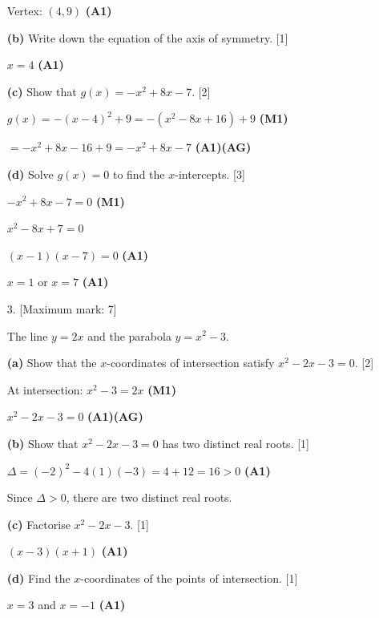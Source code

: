 \documentclass[12pt, twoside]{article}
\begin{document}
\begin{enumerate}[itemsep=0.3cm]
Vertex: $(4, 9)$ \hfill \textbf{(A1)}

\medskip

\textbf{(b)} Write down the equation of the axis of symmetry. \hfill [1]

$x = 4$ \hfill \textbf{(A1)}

\medskip

\textbf{(c)} Show that $g(x) = -x^2 + 8x - 7$. \hfill [2]

$g(x) = -(x - 4)^2 + 9 = -(x^2 - 8x + 16) + 9$ \hfill \textbf{(M1)}

$= -x^2 + 8x - 16 + 9 = -x^2 + 8x - 7$ \hfill \textbf{(A1)(AG)}

\medskip

\textbf{(d)} Solve $g(x) = 0$ to find the $x$-intercepts. \hfill [3]

$-x^2 + 8x - 7 = 0$ \hfill \textbf{(M1)}

$x^2 - 8x + 7 = 0$

$(x - 1)(x - 7) = 0$ \hfill \textbf{(A1)}

$x = 1$ or $x = 7$ \hfill \textbf{(A1)}

\newpage

\item[3.] [Maximum mark: 7]

The line $y = 2x$ and the parabola $y = x^2 - 3$.

\medskip

\textbf{(a)} Show that the $x$-coordinates of intersection
satisfy $x^2 - 2x - 3 = 0$. \hfill [2]

At intersection: $x^2 - 3 = 2x$ \hfill \textbf{(M1)}

$x^2 - 2x - 3 = 0$ \hfill \textbf{(A1)(AG)}

\medskip

\textbf{(b)} Show that $x^2 - 2x - 3 = 0$ has two distinct
real roots. \hfill [1]

$\Delta = (-2)^2 - 4(1)(-3) = 4 + 12 = 16 > 0$ \hfill \textbf{(A1)}

Since $\Delta > 0$, there are two distinct real roots.

\medskip

\textbf{(c)} Factorise $x^2 - 2x - 3$. \hfill [1]

$(x - 3)(x + 1)$ \hfill \textbf{(A1)}

\medskip

\textbf{(d)} Find the $x$-coordinates of the points
of intersection. \hfill [1]

$x = 3$ and $x = -1$ \hfill \textbf{(A1)}


\end{enumerate}
\end{document}
